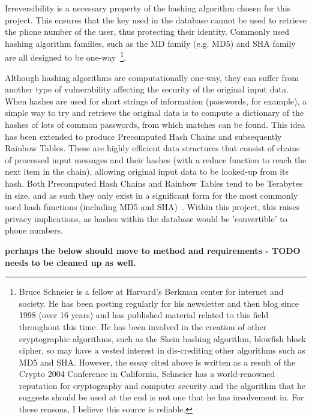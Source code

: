 \documentclass{article}
\begin{document}
Irreversibility is a necessary property of the hashing algorithm chosen for this project.  This ensures that the key used in the database cannot be used to retrieve the phone number of the user, thus protecting their identity.  Commonly used hashing algorithm families, such as the MD family (e.g. MD5) and SHA family are all designed to be one-way~\cite{schneierCryptanalysisMD5SHA}\footnote{Bruce Schneier is a fellow at Harvard's Berkman center for internet and society.  He has been posting regularly for his newsletter and then blog since 1998 (over 16 years) and has published material related to this field throughout this time.  He has been involved in the creation of other cryptographic algorithms, such as the Skein hashing algorithm, blowfish block cipher, so may have a vested interest in dis-crediting other algorithms such as MD5 and SHA.  However, the essay cited above is written as a result of the Crypto 2004 Conference in California, Schneier has a world-renowned reputation for cryptography and computer security and the algorithm that he suggests should be used at the end is not one that he has involvement in.  For these reasons, I believe this source is reliable.}.  

Although hashing algorithms are computationally one-way, they can suffer from another type of vulnerability affecting the security of the original input data.  When hashes are used for short strings of information (passwords, for example), a simple way to try and retrieve the original data is to compute a dictionary of the hashes of lots of common passwords, from which matches can be found.  This idea has been extended to produce Precomputed Hash Chains and subsequently Rainbow Tables.  These are highly efficient data structures that consist of chains of processed input messages and their hashes (with a reduce function to reach the next item in the chain), allowing original input data to be looked-up from its hash.  Both Precomputed Hash Chains and Rainbow Tables tend to be Terabytes in size, and as such they only exist in a significant form for the most commonly used hash functions (including MD5 and SHA)~\cite{Teat:2011:SCH:2016039.2016072}.  Within this project, this raises privacy implications, as hashes within the database would be 'convertible' to phone numbers.

{\bf perhaps the below should move to method and requirements - TODO needs to be cleaned up as well.}
\end{document}

